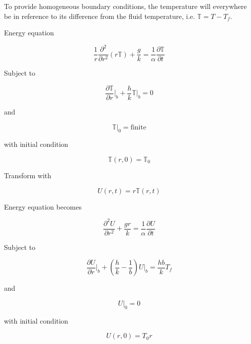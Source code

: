 
To provide homogeneous boundary conditions, the temperature will everywhere be in reference to its difference from the fluid temperature, i.e. $\mathbb{T} = T-T_f$. 

Energy equation

\begin{equation}
    \frac{1}{r}\frac{\partial^2}{\partial r^2}(r\mathbb{T}) + \frac{g}{k} = \frac{1}{\alpha}\frac{\partial \mathbb{T}}{\partial t}
\end{equation}

Subject to 

\begin{equation}
    \frac{\partial \mathbb{T}}{\partial r}\big|_b + \frac{h}{k}\mathbb{T}|_b = 0
\end{equation}

and

\begin{equation}
    \mathbb{T}|_0 = \text{finite}
\end{equation}

with initial condition

\begin{equation}
    \mathbb{T}(r,0) = \mathbb{T}_0
\end{equation}

Transform with 

\begin{equation}
    U(r,t) = r\mathbb{T}(r,t)
\end{equation}

Energy equation becomes

\begin{equation}
    \frac{\partial^2 U}{\partial r^2} + \frac{gr}{k} = \frac{1}{\alpha}\frac{\partial U}{\partial t}
\end{equation}

Subject to

\begin{equation}
    \frac{\partial U}{\partial r}\big|_b + \left(\frac{h}{k} - \frac{1}{b}\right)U|_b = \frac{hb}{k}T_f
\end{equation}

and

\begin{equation}
    U|_0 = 0
\end{equation}

with initial condition

\begin{equation}
    U(r,0) = T_0r
\end{equation}

